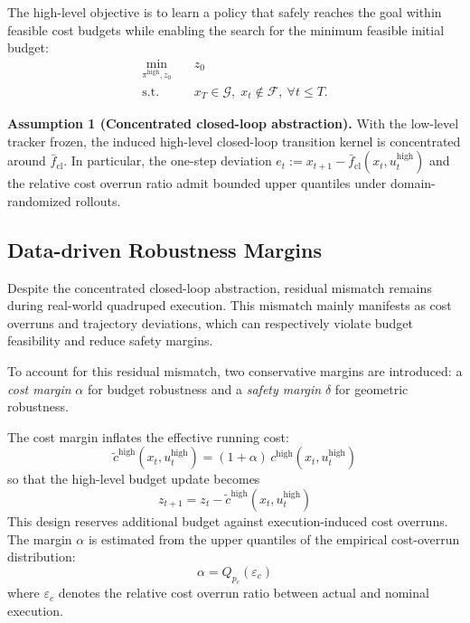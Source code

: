 \documentclass[conference]{IEEEtran}
\begin{document}
The high-level objective is to learn a policy that safely reaches the goal within feasible cost budgets while enabling the search for the minimum feasible initial budget:
\begin{align}
\min_{\pi^{\mathrm{high}}, z_0}\quad & z_0 \\
\mathrm{s.t.}\quad &
x_T \in \mathcal{G}, \;
x_t \notin \mathcal{F}, \ \forall t\le T .
\end{align}

\noindent\textbf{Assumption 1 (Concentrated closed-loop abstraction).}
With the low-level tracker frozen, the induced high-level closed-loop transition kernel is concentrated around $\bar{f}_{\mathrm{cl}}$. In particular, the one-step deviation
\(
e_t:=x_{t+1}-\bar{f}_{\mathrm{cl}}(x_t,u_t^{\mathrm{high}})
\)
and the relative cost overrun ratio admit bounded upper quantiles under domain-randomized rollouts.

\subsection{Data-driven Robustness Margins}

Despite the concentrated closed-loop abstraction, residual mismatch remains during real-world quadruped execution. This mismatch mainly manifests as cost overruns and trajectory deviations, which can respectively violate budget feasibility and reduce safety margins.

To account for this residual mismatch, two conservative margins are introduced: a \emph{cost margin} $\alpha$ for budget robustness and a \emph{safety margin} $\delta$ for geometric robustness.

The cost margin inflates the effective running cost:
\begin{equation}
\tilde{c}^{\mathrm{high}}(x_t,u_t^{\mathrm{high}})
=(1+\alpha)\, c^{\mathrm{high}}(x_t,u_t^{\mathrm{high}})
\end{equation}
so that the high-level budget update becomes
\begin{equation}
z_{t+1}=z_t-\tilde{c}^{\mathrm{high}}(x_t,u_t^{\mathrm{high}})
\end{equation}
This design reserves additional budget against execution-induced cost overruns. The margin $\alpha$ is estimated from the upper quantiles of the empirical cost-overrun distribution:
\begin{equation}
\alpha = Q_{p_c}(\varepsilon_c)
\end{equation}
where $\varepsilon_c$ denotes the relative cost overrun ratio between actual and nominal execution.
\end{document}
